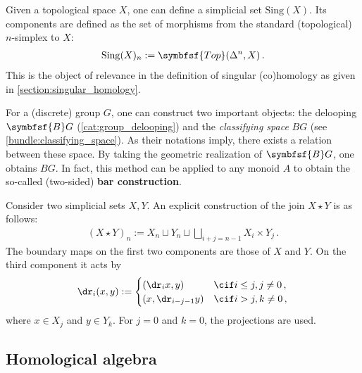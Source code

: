     \begin{example}\label{model:singular_set}
        Given a topological space $X$, one can define a simplicial set $\mathrm{Sing}(X)$. Its components are defined as the set of morphisms from the standard (topological) $n$-simplex to $X$:
        \begin{gather}
            \mathrm{Sing}(X)_n := \symbfsf{Top}(\Delta^n,X)\,.
        \end{gather}
        This is the object of relevance in the definition of singular (co)homology as given in \cref{section:singular_homology}.
    \end{example}

    \begin{property}\label{model:classifying_space}
        For a (discrete) group $G$, one can construct two important objects: the delooping $\symbfsf{B}G$ (\cref{cat:group_delooping}) and the \textit{classifying space} $BG$ (see \cref{bundle:classifying_space}). As their notations imply, there exists a relation between these space. By taking the geometric realization of $\symbfsf{B}G$, one obtains $BG$. In fact, this method can be applied to any monoid $A$ to obtain the so-called (two-sided) \textbf{bar construction}.
    \end{property}

    \begin{construct}[Join]
        Consider two simplicial sets $X,Y$. An explicit construction of the join $X\star Y$ is as follows:
        \begin{gather}
            (X\star Y)_n := X_n\sqcup Y_n\sqcup\bigsqcup_{i+j=n-1}X_i\times Y_j\,.
        \end{gather}
        The boundary maps on the first two components are those of $X$ and $Y$. On the third component it acts by
        \begin{gather}
            \dr_i(x,y) :=
            \begin{cases}
                (\dr_ix,y)&\cif i\leq j,j\neq0\,,\\
                (x,\dr_{i-j-1}y)&\cif i>j,k\neq0\,,
            \end{cases}
        \end{gather}
        where $x\in X_j$ and $y\in Y_k$. For $j=0$ and $k=0$, the projections are used.
    \end{construct}

\subsection{Homological algebra}

